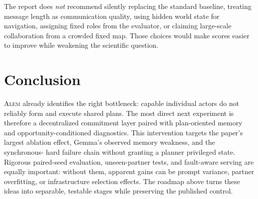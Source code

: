 \documentclass[11pt]{article}
\newcommand{\alem}{\textsc{Alem}}
\begin{document}
The report does \emph{not} recommend silently replacing the standard baseline, treating message
length as communication quality, using hidden world state for navigation, assigning fixed roles from
the evaluator, or claiming large-scale collaboration from a crowded fixed map.  Those choices would
make scores easier to improve while weakening the scientific question.

\section{Conclusion}

\alem{} already identifies the right bottleneck: capable individual actors do not reliably form and
execute shared plans.  The most direct next experiment is therefore a decentralized commitment
layer paired with plan-oriented memory and opportunity-conditioned diagnostics.  This intervention
targets the paper's largest ablation effect, Gemma's observed memory weakness, and the synchronous-
hard failure chain without granting a planner privileged state.  Rigorous paired-seed evaluation,
unseen-partner tests, and fault-aware serving are equally important: without them, apparent gains can
be prompt variance, partner overfitting, or infrastructure selection effects.  The roadmap above turns
these ideas into separable, testable stages while preserving the published control.



\end{document}
